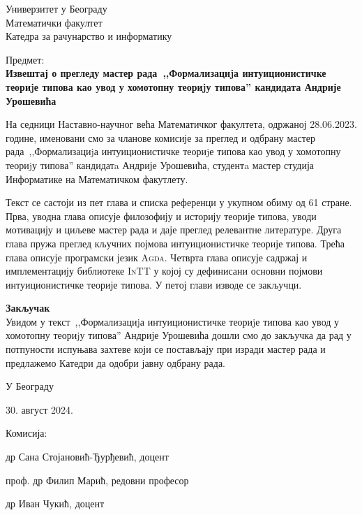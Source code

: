 \documentclass{letter}
\begin{document}
Универзитет у Београду\\
Математички факултет\\
Катедра за рачунарство и информатику

\vspace{2cm}

Предмет:\\
\textbf{Извештај о прегледу мастер рада~,,Формализациjа интуиционистичке теориjе типова као увод у хомотопну теориjу типова'' кандидата Андрије Урошевића}

\vspace{0.6cm}

На седници Наставно-научног већа Математичког факултета, одржаној 28.06.2023. године, именовани смо за чланове комисије за преглед и одбрану мастер рада~,,Формализациjа интуиционистичке теориjе типова као увод у хомотопну теориjу типова'' кандидатa Андрије Урошевића, студентa мастер студија Информатике на Математичком факутлету.

Текст се састоји из пет глава и списка референци у укупном обиму од 61 стране. Прва, уводна глава описује филозофију и историју теорије типова, уводи мотивацију и циљеве мастер рада и даје преглед релевантне литературе. Друга глава пружа преглед кључних појмова интуиционистичке теорије типова. Трећа глава описује програмски језик \textsc{Agda}. Четврта глава описује садржај и имплементацију библиотеке \textsc{InTT} у којој су дефинисани основни појмови интуиционистичке теорије типова. У петој глави изводе се закључци.

\vspace{0.4cm}

\textbf{Закључак}\\
Увидом у текст~,,Формализациjа интуиционистичке теориjе типова као увод у хомотопну теориjу типова'' Андрије Урошевића дошли смо до закључка да рад у потпуности испуњава захтеве који се постављају при изради мастер рада и предлажемо Катедри да одобри јавну одбрану рада.

\vspace{1.2cm}

У Београду

30. август 2024.

\vspace{0.5cm}

Комисија:

др Сана Стојановић-Ђурђевић, доцент

проф. др Филип Марић, редовни професор

др Иван Чукић, доцент
\end{document}

